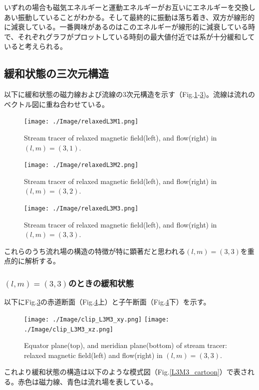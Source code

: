 \documentclass[12pt]{jsarticle}
\begin{document}
いずれの場合も磁気エネルギーと運動エネルギーがお互いにエネルギーを交換しあい振動していることがわかる。そして最終的に振動は落ち着き、双方が線形的に減衰している。一番興味があるのはこのエネルギーが線形的に減衰している時で、それぞれグラフがプロットしている時刻の最大値付近では系が十分緩和していると考えられる。

\subsection{緩和状態の三次元構造}
以下に緩和状態の磁力線および流線の3次元構造を示す（Fig.\ref{L3M1_relaxed}-\ref{L3M3_relaxed})。流線は流れのベクトル図に重ね合わせている。

\begin{figure}[H]
\centering
\texttt{[image: ./Image/relaxedL3M1.png]}
\caption{Stream tracer of relaxed magnetic field(left), and flow(right) in $(l,m)=(3,1)$.} \label{L3M1_relaxed}
\end{figure}
\begin{figure}[H]
\centering
\texttt{[image: ./Image/relaxedL3M2.png]}
\caption{Stream tracer of relaxed magnetic field(left), and flow(right) in $(l,m)=(3,2)$.} \label{L3M2_relaxed}
\end{figure}
\begin{figure}[H]
\centering
\texttt{[image: ./Image/relaxedL3M3.png]}
\caption{Stream tracer of relaxed magnetic field(left), and flow(right) in $(l,m)=(3,3)$.}\label{L3M3_relaxed}
\end{figure}

これらのうち流れ場の構造の特徴が特に顕著だと思われる$(l,m)=(3,3)$を重点的に解析する。
\subsubsection{$(l,m)=(3,3)$のときの緩和状態}
以下にFig.\ref{L3M3_relaxed}の赤道断面（Fig.\ref{clip_L3M3_xy}上）と子午断面（Fig.\ref{clip_L3M3_xy}下）を示す。
\begin{figure}[H]
\centering
\texttt{[image: ./Image/clip\_L3M3\_xy.png]}
\texttt{[image: ./Image/clip\_L3M3\_xz.png]}
\caption{Equator plane(top), and meridian plane(bottom) of stream tracer: relaxed magnetic field(left) and flow(right) in $(l,m)=(3,3)$.}\label{clip_L3M3_xy}
\end{figure}

これより緩和状態の構造は以下のような模式図（Fig.\ref{L3M3_cartoon}）で表される。赤色は磁力線、青色は流れ場を表している。
\end{document}
